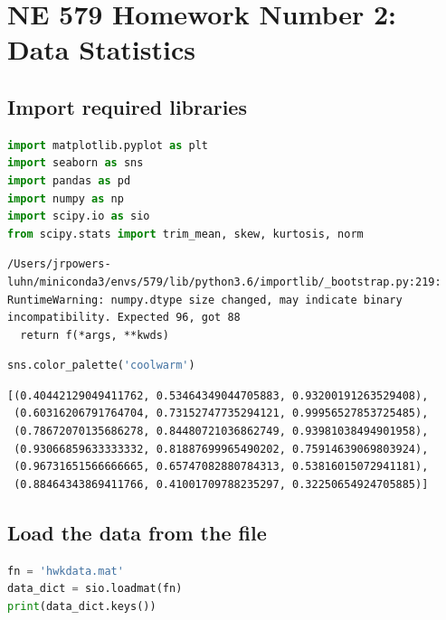 \hypertarget{ne-579-homework-number-2-data-statistics}{%
\section{NE 579 Homework Number 2: Data
Statistics}\label{ne-579-homework-number-2-data-statistics}}

\hypertarget{import-required-libraries}{%
\subsection{Import required libraries}\label{import-required-libraries}}

\begin{lstlisting}[language=Python]
%matplotlib inline
import matplotlib.pyplot as plt
import seaborn as sns
import pandas as pd
import numpy as np
import scipy.io as sio
from scipy.stats import trim_mean, skew, kurtosis, norm
\end{lstlisting}

\begin{lstlisting}
/Users/jrpowers-luhn/miniconda3/envs/579/lib/python3.6/importlib/_bootstrap.py:219: RuntimeWarning: numpy.dtype size changed, may indicate binary incompatibility. Expected 96, got 88
  return f(*args, **kwds)
\end{lstlisting}

\begin{lstlisting}[language=Python]
sns.color_palette('coolwarm')
\end{lstlisting}

\begin{lstlisting}
[(0.40442129049411762, 0.53464349044705883, 0.93200191263529408),
 (0.60316206791764704, 0.73152747735294121, 0.99956527853725485),
 (0.78672070135686278, 0.84480721036862749, 0.93981038494901958),
 (0.93066859633333332, 0.81887699965490202, 0.75914639069803924),
 (0.96731651566666665, 0.65747082880784313, 0.53816015072941181),
 (0.88464343869411766, 0.41001709788235297, 0.32250654924705885)]
\end{lstlisting}

\hypertarget{load-the-data-from-the-file}{%
\subsection{Load the data from the
file}\label{load-the-data-from-the-file}}

\begin{lstlisting}[language=Python]
fn = 'hwkdata.mat'
data_dict = sio.loadmat(fn)
print(data_dict.keys())
\end{lstlisting}

